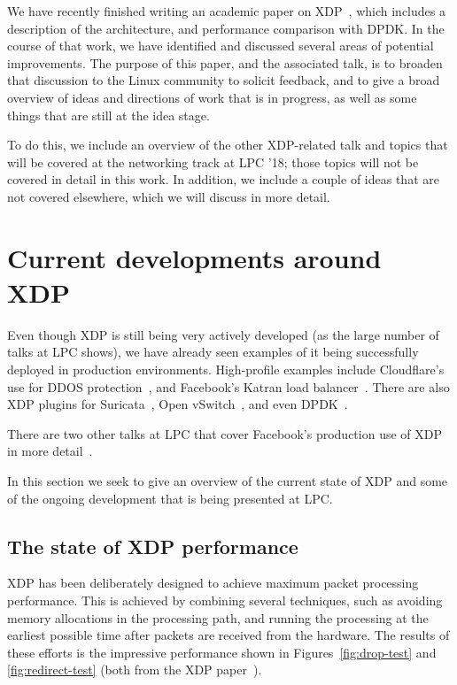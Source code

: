 \documentclass[sigconf]{acmart}
\begin{document}
We have recently finished writing an academic paper on XDP~\cite{xdp-paper},
which includes a description of the architecture, and performance comparison
with DPDK. In the course of that work, we have identified and discussed several
areas of potential improvements. The purpose of this paper, and the associated
talk, is to broaden that discussion to the Linux community to solicit feedback,
and to give a broad overview of ideas and directions of work that is in
progress, as well as some things that are still at the idea stage.

To do this, we include an overview of the other XDP-related talk and topics that
will be covered at the networking track at LPC '18; those topics will not be
covered in detail in this work. In addition, we include a couple of ideas that
are not covered elsewhere, which we will discuss in more detail.

\section{Current developments around XDP}

Even though XDP is still being very actively developed (as the large number of
talks at LPC shows), we have already seen examples of it being successfully
deployed in production environments. High-profile examples include Cloudflare's
use for DDOS protection~\cite{cloudflare-ddos}, and Facebook's Katran load
balancer~\cite{katran}. There are also XDP plugins for Suricata~\cite{suricata},
Open vSwitch~\cite{ovs-xdp}, and even DPDK~\cite{dpdk-xdp}.

There are two other talks at LPC that cover Facebook's production use of XDP in
more detail~\cite{facebook-lessons,facebook-firewall}.

In this section we seek to give an overview of the current state of XDP and some
of the ongoing development that is being presented at LPC.

\subsection{The state of XDP performance}
\label{sec:state-xdp-perf}

XDP has been deliberately designed to achieve maximum packet processing
performance. This is achieved by combining several techniques, such as avoiding
memory allocations in the processing path, and running the processing at the
earliest possible time after packets are received from the hardware. The results
of these efforts is the impressive performance shown in
Figures~\ref{fig:drop-test} and \ref{fig:redirect-test} (both from the XDP
paper~\cite{xdp-paper}).
\end{document}
